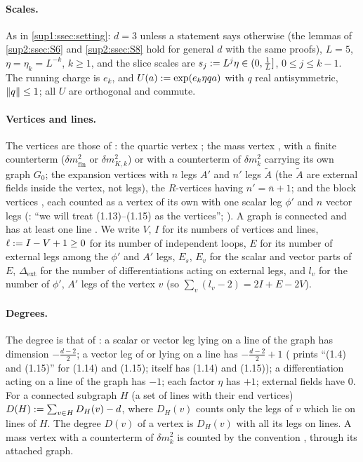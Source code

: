 \paragraph{Scales.} As in \cref{sup1:ssec:setting}: $d=3$ unless a statement says otherwise (the lemmas of \cref{sup2:ssec:S6} and \cref{sup2:ssec:S8} hold for general $d$ with the same proofs), $L=5$, $\eta=\eta_k=L^{-k}$, $k\ge1$, and the slice scales are $s_j:= L^j\eta\in(0,\frac1L]$, $0\le j\le k-1$. The running charge is $e_k$, and $U(a):=\exp(e_k\eta qa)$ with $q$ real antisymmetric, $\lVert q\rVert\le1$; all $U$ are orthogonal and commute.

\paragraph{Vertices and lines.} The vertices are those of \cite[(1.6)--(1.15)]{Ba3}: the quartic vertex \cite[(1.6)]{Ba3}; the mass vertex \cite[(1.7)]{Ba3}, with a finite counterterm ($\delta m^2_{\mathrm{fin}}$ or $\delta m^2_{K,k}$) or with a counterterm of $\delta m^2_k$ carrying its own graph $G_0$; the expansion vertices \cite[(1.8)--(1.11)]{Ba3} with $n$ legs $A'$ and $n'$ legs $\tilde A$ (the $\tilde A$ are external fields inside the vertex, not legs), the $R$-vertices \cite[(1.9), (1.11)]{Ba3} having $n'=\bar n+1$; and the block vertices \cite[(1.13)--(1.15)]{Ba3}, each counted as a vertex of its own with one scalar leg $\phi'$ and $n$ vector legs (\cite[p.~414]{Ba3}: ``we will treat (1.13)--(1.15) as the vertices''; \cite[p.~423 (v)]{Ba3}). A graph is connected and has at least one line \cite[p.~415]{Ba3}. We write $V$, $I$ for its numbers of vertices and lines, $\ell:= I-V+1\ge0$ for its number of independent loops, $E$ for its number of external legs among the $\phi'$ and $A'$ legs, $E_s$, $E_v$ for the scalar and vector parts of $E$, $\Delta_{\mathrm{ext}}$ for the number of differentiations acting on external legs, and $l_v$ for the number of $\phi'$, $A'$ legs of the vertex $v$ (so $\sum_v(l_v-2)=2I+E-2V$).

\paragraph{Degrees.} The degree is that of \cite[(2.1)--(2.3)]{Ba3}: a scalar or vector leg lying on a line of the graph has dimension $-\frac{d-2}2$; a vector leg of \cite[(1.14)]{Ba3} or \cite[(1.15)]{Ba3} lying on a line has $-\frac{d-2}2+1$ (\cite[p.~422]{Ba3} prints ``(1.4) and (1.15)'' for (1.14) and (1.15); \cite[(2.1)]{Ba3} itself has (1.14) and (1.15)); a differentiation acting on a line of the graph has $-1$; each factor $\eta$ has $+1$; external fields have $0$. For a connected subgraph $H$ (a set of lines with their end vertices) $D(H):=\sum_{v\in H}D_H(v)-d$, where $D_H(v)$ counts only the legs of $v$ which lie on lines of $H$. The degree $D(v)$ of a vertex is $D_H(v)$ with all its legs on lines. A mass vertex with a counterterm of $\delta m^2_k$ is counted by the convention \cite[(2.3)]{Ba3}, through its attached graph.

